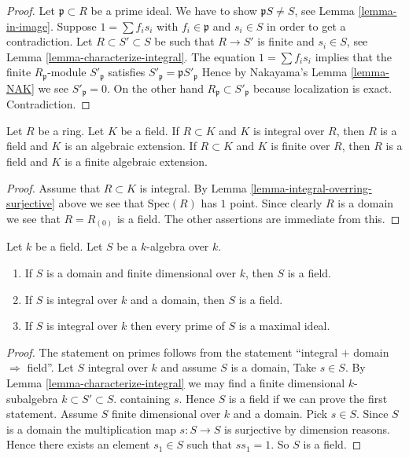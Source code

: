 \begin{proof}
Let $\mathfrak p \subset R$ be a prime ideal.
We have to show $\mathfrak pS \not = S$, see Lemma \ref{lemma-in-image}.
Suppose $1 = \sum f_i s_i$ with $f_i \in \mathfrak p$
and $s_i \in S$ in order to get a contradiction.
Let $R \subset S' \subset S$
be such that $R\to S'$ is finite and $s_i \in S$,
see Lemma \ref{lemma-characterize-integral}.
The equation $1 = \sum f_i s_i$ implies that
the finite $R_{\mathfrak p}$-module
$S'_{\mathfrak p}$ satisfies
$S'_{\mathfrak p} = \mathfrak pS'_{\mathfrak p}$
Hence by Nakayama's Lemma \ref{lemma-NAK}
we see $S'_{\mathfrak p} = 0$. On the other hand
$R_{\mathfrak p} \subset S'_{\mathfrak p}$ because localization
is exact. Contradiction.
\end{proof}

\begin{lemma}
\label{lemma-integral-under-field}
Let $R$ be a ring. Let $K$ be a field.
If $R \subset K$ and $K$ is integral over $R$,
then $R$ is a field and $K$ is an algebraic extension.
If $R \subset K$ and $K$ is finite over $R$,
then $R$ is a field and $K$ is a finite algebraic extension.
\end{lemma}

\begin{proof}
Assume that $R \subset K$ is integral.
By Lemma \ref{lemma-integral-overring-surjective} above we see that
$\text{Spec}(R)$ has $1$ point. Since clearly $R$ is a domain we see
that $R = R_{(0)}$ is a field. The other assertions are immediate
from this.
\end{proof}

\begin{lemma}
\label{lemma-integral-over-field}
Let $k$ be a field. Let $S$ be a $k$-algebra over $k$.
\begin{enumerate}
\item If $S$ is a domain and finite dimensional over $k$,
then $S$ is a field.
\item If $S$ is integral over $k$ and a domain,
then $S$ is a field.
\item If $S$ is integral over $k$ then every prime of
$S$ is a maximal ideal.
\end{enumerate}
\end{lemma}

\begin{proof}
The statement on primes follows from the statement
``integral $+$ domain $\Rightarrow$ field''.
Let $S$ integral over $k$ and assume $S$ is a domain,
Take $s \in S$. By Lemma
\ref{lemma-characterize-integral} we may find a
finite dimensional $k$-subalgebra $k \subset S' \subset S$.
containing $s$. Hence $S$ is a field if we can prove the
first statement. Assume $S$ finite dimensional
over $k$ and a domain. Pick $s\in S$.
Since $S$ is a domain the multiplication
map $s : S \to S$ is surjective by dimension
reasons. Hence there exists an element $s_1 \in S$
such that $ss_1 = 1$. So $S$ is a field.
\end{proof}


